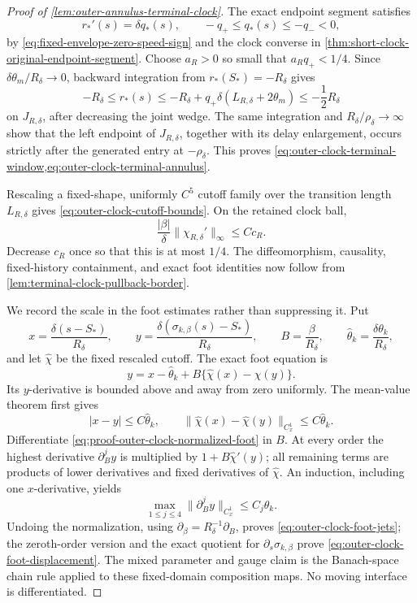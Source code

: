 \begin{proof}[Proof of \cref{lem:outer-annulus-terminal-clock}]
The exact endpoint segment satisfies
\[
 r_*'(s)=\delta q_*(s),
 \qquad -q_+\le q_*(s)\le-q_-<0,
\]
by \cref{eq:fixed-envelope-zero-speed-sign} and the clock converse in
\cref{thm:short-clock-original-endpoint-segment}.  Choose \(a_R>0\)
so small that \(a_Rq_+<1/4\).  Since
\(\delta\theta_m/R_\delta\to0\), backward integration from
\(r_*(S_*)=-R_\delta\) gives
\[
 -R_\delta\le r_*(s)
 \le -R_\delta+q_+\delta
       (L_{R,\delta}+2\theta_m)
 \le-\frac12R_\delta
\]
on \(J_{R,\delta}\), after decreasing the joint wedge.  The same
integration and \(R_\delta/\rho_\delta\to\infty\) show that the left
endpoint of \(J_{R,\delta}\), together with its delay enlargement,
occurs strictly after the generated entry at \(-\rho_\delta\).
This proves
\cref{eq:outer-clock-terminal-window,eq:outer-clock-terminal-annulus}.

Rescaling a fixed-shape, uniformly \(C^5\) cutoff family over the
transition length \(L_{R,\delta}\) gives
\cref{eq:outer-clock-cutoff-bounds}.  On the retained clock ball,
\[
 \frac{|\beta|}{\delta}
       \|\chi_{R,\delta}'\|_\infty
 \le Cc_R.
\]
Decrease \(c_R\) once so that this is at most \(1/4\).  The
diffeomorphism, causality, fixed-history containment, and exact foot
identities now follow from
\cref{lem:terminal-clock-pullback-border}.

We record the scale in the foot estimates rather than suppressing it.
Put
\[
 x=\frac{\delta(s-S_*)}{R_\delta},\qquad
 y=\frac{\delta(\sigma_{k,\beta}(s)-S_*)}{R_\delta},\qquad
 B=\frac{\beta}{R_\delta},\qquad
 \widehat\theta_k=\frac{\delta\theta_k}{R_\delta},
\]
and let \(\widehat\chi\) be the fixed rescaled cutoff.  The exact foot
equation is
\begin{equation}
 y=x-\widehat\theta_k
   +B\{\widehat\chi(x)-\widehat\chi(y)\}.       \label{eq:proof-outer-clock-normalized-foot}
\end{equation}
Its \(y\)-derivative is bounded above and away from zero uniformly.
The mean-value theorem first gives
\[
 |x-y|\le C\widehat\theta_k,\qquad
 \|\widehat\chi(x)-\widehat\chi(y)\|_{C^1_x}
 \le C\widehat\theta_k.
\]
Differentiate
\cref{eq:proof-outer-clock-normalized-foot} in \(B\).  At every order
the highest derivative \(\partial_B^j y\) is multiplied by
\(1+B\widehat\chi'(y)\); all remaining terms are products of lower
derivatives and fixed derivatives of \(\widehat\chi\).  An induction,
including one \(x\)-derivative, yields
\begin{equation}
 \max_{1\le j\le4}
 \|\partial_B^j y\|_{C^1_x}
 \le C_j\widehat\theta_k.                      \label{eq:proof-outer-clock-normalized-jets}
\end{equation}
Undoing the normalization, using
\(\partial_\beta=R_\delta^{-1}\partial_B\), proves
\cref{eq:outer-clock-foot-jets}; the zeroth-order version and the exact
quotient for \(\partial_s\sigma_{k,\beta}\) prove
\cref{eq:outer-clock-foot-displacement}.  The mixed parameter and gauge
claim is the Banach-space chain rule applied to these fixed-domain
composition maps.  No moving interface is differentiated.


\end{proof}
